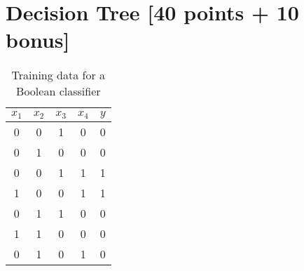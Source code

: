 \documentclass[12pt, fullpage,letterpaper]{article}
\begin{document}
\section{Decision Tree [40 points + 10 bonus]}
\begin{table}[h]
	\centering
	\begin{tabular}{cccc|c}
		$x_1$ & $x_2$ & $x_3$ & $x_4$ & $y$\\ 
		\hline\hline
		0 & 0 & 1 & 0 & 0 \\ \hline
		0 & 1 & 0 & 0 & 0 \\ \hline
		0 & 0 & 1 & 1 & 1 \\ \hline
		1 & 0 & 0 & 1 & 1 \\ \hline
		0 & 1 & 1 & 0 & 0\\ \hline
		1 & 1 & 0 & 0 & 0\\ \hline
		0 & 1 & 0 & 1 & 0\\ \hline
	\end{tabular}
	\caption{Training data for a Boolean classifier}
\end{table}
\end{document}
